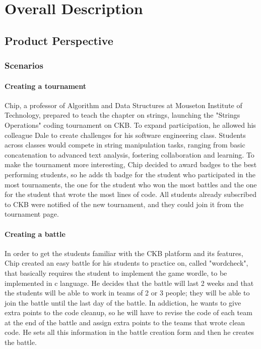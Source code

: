 \chapter{Overall Description}
\section{Product Perspective}
\subsection{Scenarios}

\subsubsection{Creating a tournament}
Chip, a professor of Algorithm and Data Structures at Mouseton Institute of Technology, prepared to teach the chapter on strings, launching the "Strings Operations" coding tournament on CKB.
To expand participation, he allowed his colleague Dale to create challenges for his software engineering class.
Students across classes would compete in string manipulation tasks, ranging from basic concatenation to advanced text analysis, fostering collaboration and learning.
To make the tournament more interesting, Chip decided to award badges to the best performing students, so he adds th badge for the student who participated in the most tournaments, the one for the student who won the most battles and the one for the student that wrote the most lines of code.
All students already subscribed to CKB were notified of the new tournament, and they could join it from the tournament page.

\subsubsection{Creating a battle}
In order to get the students familiar with the CKB platform and its features, Chip created an easy battle for his students to practice on, called "wordcheck", that basically requires the student to implement the game wordle, to be implemented in c language.
He decides that the battle will last 2 weeks and that the students will be able to work in teams of 2 or 3 people; they will be able to join the battle until the last day of the battle.
In addiction, he wants to give extra points to the code cleanup, so he will have to revise the code of each team at the end of the battle and assign extra points to the teams that wrote clean code.
He sets all this information in the battle creation form and then he creates the battle.

